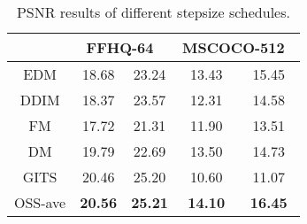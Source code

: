 \documentclass[10pt,twocolumn,letterpaper]{article}
\begin{document}
\begin{table}[H]
\begin{tabular}{c|cc|cc}
\midrule
                                                         & \multicolumn{2}{c|}{\textcolor[rgb]{0.2,0.2,0.2}{FFHQ-64~\cite{ffhq}}}                                              & \multicolumn{2}{c}{\textcolor[rgb]{0.2,0.2,0.2}{MSCOCO-512}~\cite{coco}}        \\ 
\hline
\textcolor[rgb]{0.2,0.2,0.2}{EDM}                        & \textcolor[rgb]{0.2,0.2,0.2}{18.68}          & \textcolor[rgb]{0.2,0.2,0.2}{23.24}                      & \textcolor[rgb]{0.2,0.2,0.2}{13.43}          & \textcolor[rgb]{0.2,0.2,0.2}{15.45}                \\
\textcolor[rgb]{0.2,0.2,0.2}{DDIM}                       & \textcolor[rgb]{0.2,0.2,0.2}{18.37}          & \textcolor[rgb]{0.2,0.2,0.2}{23.57}                      & \textcolor[rgb]{0.2,0.2,0.2}{12.31}          & \textcolor[rgb]{0.2,0.2,0.2}{14.58}                \\
\textcolor[rgb]{0.2,0.2,0.2}{FM}                         & \textcolor[rgb]{0.2,0.2,0.2}{17.72}          & \textcolor[rgb]{0.2,0.2,0.2}{21.31}                      & \textcolor[rgb]{0.2,0.2,0.2}{11.90}          & \textcolor[rgb]{0.2,0.2,0.2}{13.51}                \\
\textcolor[rgb]{0.2,0.2,0.2}{DM}                         & \textcolor[rgb]{0.2,0.2,0.2}{19.79}          & \textcolor[rgb]{0.2,0.2,0.2}{22.69}                      & \textcolor[rgb]{0.2,0.2,0.2}{13.50}          & \textcolor[rgb]{0.2,0.2,0.2}{14.73}                \\
\textcolor[rgb]{0.2,0.2,0.2}{GITS}                       & \textcolor[rgb]{0.2,0.2,0.2}{20.46}          & \textcolor[rgb]{0.2,0.2,0.2}{25.20}                      & \textcolor[rgb]{0.2,0.2,0.2}{10.60}          & \textcolor[rgb]{0.2,0.2,0.2}{11.07}                \\
\textcolor[rgb]{0.2,0.2,0.2}{OSS-ave}                    & \textcolor[rgb]{0.2,0.2,0.2}{\textbf{20.56}} & \textcolor[rgb]{0.2,0.2,0.2}{\textbf{25.21}}             & \textcolor[rgb]{0.2,0.2,0.2}{\textbf{14.10}} & \textcolor[rgb]{0.2,0.2,0.2}{\textbf{16.45}}       \\
\bottomrule
\end{tabular}
\vspace{-0.3cm}
\caption{PSNR results of different stepsize schedules.}
\label{table:compare}
\end{table}
\end{document}
